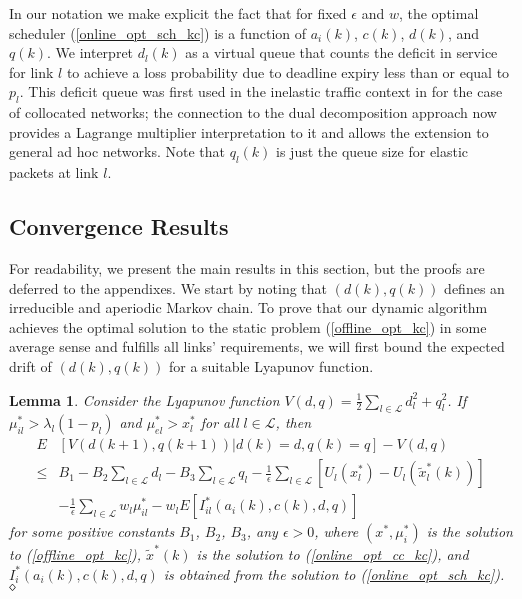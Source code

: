 \documentclass[conference]{IEEEtran}
\newtheorem{lemma}{Lemma}
\begin{document}
In our notation we make explicit the fact that for fixed $\epsilon$ and $w$, the optimal scheduler (\ref{online_opt_sch_kc}) is a function of $a_i(k)$, $c(k)$, $d(k)$, and $q(k)$. We interpret $d_l(k)$ as a virtual queue that counts the deficit in service for link $l$ to achieve a loss probability due to deadline expiry less than or equal to $p_l$. This deficit queue was first used in the inelastic traffic context in \cite{Hou09a} for the case of collocated networks; the connection to the dual decomposition approach now provides a Lagrange multiplier interpretation to it and allows the extension to general ad hoc networks. Note that $q_l(k)$ is just the queue size for elastic packets at link $l$.

\subsection{Convergence Results}
\label{convergence_kc}

For readability, we present the main results in this section, but the proofs are deferred to the appendixes. We start by noting that $(d(k),q(k))$ defines an irreducible and aperiodic Markov chain. To prove that our dynamic algorithm achieves the optimal solution to the static problem (\ref{offline_opt_kc}) in some average sense and fulfills all links' requirements, we will first bound the expected drift of $(d(k),q(k))$ for a suitable Lyapunov function.

\begin{lemma}
\label{expected_drift_kc}
Consider the Lyapunov function $V(d,q)=\frac{1}{2}\sum_{l \in \mathcal{L}}d_l^2+q_l^2$. If $\mu^*_{il} > \lambda_l(1-p_l)$ and $\mu^*_{el} > x_l^*$ for all $l \in \mathcal{L}$, then
\begin{align*}
	E & \left[ V(d(k+1),q(k+1)) | d(k)=d, q(k)=q \right] - V(d,q) \\
 	\leq & B_1 - B_2 \sum_{l \in \mathcal{L}} d_l - B_3 \sum_{l \in \mathcal{L}} q_l - \frac{1}{\epsilon} \sum_{l \in \mathcal{L}} [ U_l(x_l^*) - U_l(\tilde{x}_l^*(k)) ] \\
 	& - \frac{1}{\epsilon} \sum_{l \in \mathcal{L}} w_l \mu^*_{il} - w_l E \left[ I_{il}^*(a_i(k),c(k),d,q) \right]
\end{align*}
for some positive constants $B_1$, $B_2$, $B_3$, any $\epsilon>0$, where $(x^*, \mu_i^*)$ is the solution to (\ref{offline_opt_kc}), $\tilde{x}^*(k)$ is the solution to (\ref{online_opt_cc_kc}), and $I_i^*(a_i(k),c(k),d,q)$ is obtained from the solution to (\ref{online_opt_sch_kc}).
$\hfill \diamond$
\end{lemma}
\end{document}
